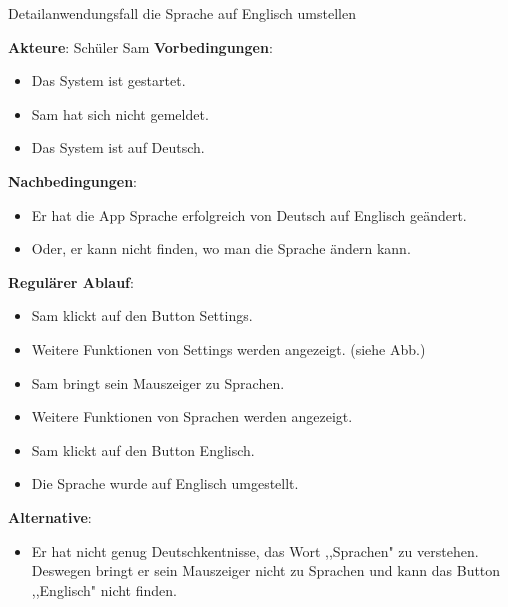 \begin{answer}
    Detailanwendungsfall die Sprache auf Englisch umstellen 
\end{answer}
\newline
\textbf{Akteure}: Schüler Sam
\newline
\textbf{Vorbedingungen}: 
\begin{itemize}  
    \item Das System ist gestartet.
    \item Sam hat sich nicht gemeldet.
   \item Das System ist auf Deutsch.
\end{itemize} 
\textbf{Nachbedingungen}: 
\begin{itemize}  
    \item Er hat die App Sprache erfolgreich von Deutsch auf Englisch geändert.
   \item Oder, er kann nicht finden, wo man die Sprache ändern kann.\\
\end{itemize}
\textbf{Regulärer Ablauf}: 
\begin{itemize}  
    \item Sam klickt auf den Button Settings.
   \item Weitere Funktionen von Settings werden angezeigt. (siehe Abb.)
   \item Sam bringt sein Mauszeiger zu Sprachen.
    \item Weitere Funktionen von Sprachen werden angezeigt.
    \item Sam klickt auf den Button Englisch.
     \item Die Sprache wurde auf Englisch umgestellt.
\end{itemize}
\textbf{Alternative}: 
\begin{itemize}  
    \item Er hat nicht genug Deutschkentnisse, das Wort ,,Sprachen" zu verstehen. Deswegen bringt er sein Mauszeiger nicht zu Sprachen und kann das Button ,,Englisch" nicht finden.
\end{itemize} 